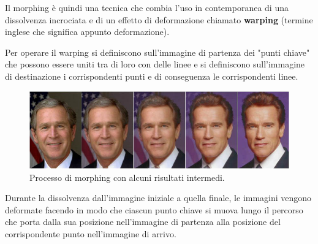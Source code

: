 \vspace{1em} \noindent
Il morphing è quindi una tecnica che combia l'uso in contemporanea di una dissolvenza incrociata e di un effetto di deformazione chiamato \textbf{warping} (termine inglese che significa appunto deformazione).

\vspace{1em} \noindent
Per operare il warping si definiscono sull'immagine di partenza dei "punti chiave" che possono essere uniti tra di loro con delle linee e si definiscono sull'immagine di destinazione i corrispondenti punti e di conseguenza le corrispondenti linee.\\ 
\begin{figure}[htb] \centering
\includegraphics[scale=0.5, trim = 0 1.1cm 0 0, clip]{Pictures/Striscia_morphing.jpg}
\caption{Processo di morphing con alcuni risultati intermedi.}\label{fig:figura}
\end{figure}

\noindent
Durante la dissolvenza dall'immagine iniziale a quella finale, le immagini vengono deformate facendo in modo che ciascun punto chiave si muova lungo il percorso che porta dalla sua posizione nell'immagine di partenza alla posizione del corrispondente punto nell'immagine di arrivo.